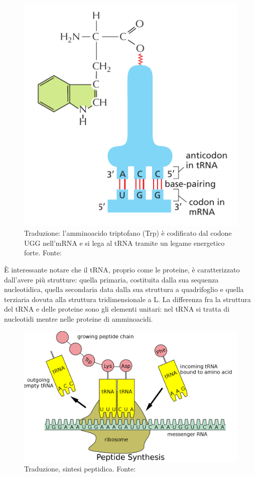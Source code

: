\begin{figure}[!htb]
	\includegraphics[scale=0.45]{images/tRNA-legame-traduzione.png}
	\caption{Traduzione: l'amminoacido triptofano (Trp) è codificato dal codone UGG nell'mRNA e si lega al tRNA tramite un legame energetico forte. Fonte: \cite{alberts2018essential}}
	\label{fig:tRNA-legame}
	\endminipage\hfill
\end{figure}

\par È interessante notare che il tRNA, proprio come le proteine, è caratterizzato dall'avere più strutture: quella primaria, costituita dalla sua sequenza nucleotidica, quella secondaria data dalla sua struttura a quadrifoglio e quella terziaria dovuta alla struttura tridimensionale a L. La differenza fra la struttura del tRNA e delle proteine sono gli elementi unitari: nel tRNA si tratta di nucleotidi mentre nelle proteine di amminoacidi.

\begin{figure}[h]
	\centering
	\includegraphics[scale=0.15]{images/traduzione.png}
	\caption{Traduzione, sintesi peptidica. Fonte: \cite{tRNAwiki}}
	\label{fig:traduzione}
\end{figure}

